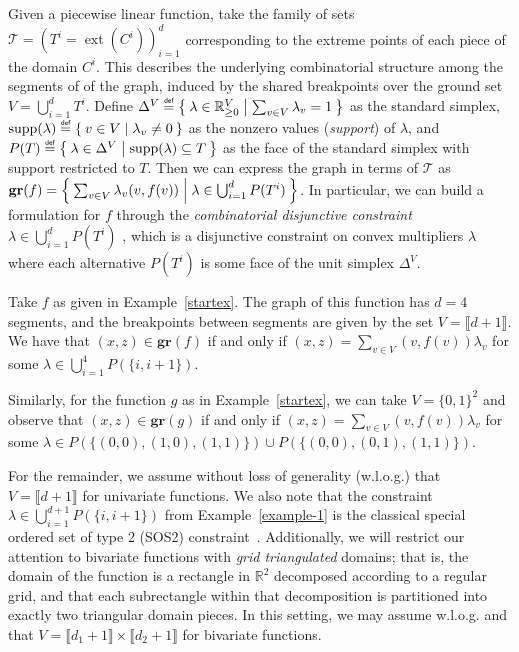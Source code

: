 \documentclass[opre,nonblindrev]{informs3} %
\newcommand{\blue}[1]{{#1}}
\newcommand{\bbR}{\mathbb{R}}
\newcommand{\calT}{\mathcal{T}}
\newcommand{\gr}{\textbf{gr}}
\newcommand{\ext}{\operatorname{ext}}
\newcommand{\supp}{\operatorname{supp}}
\newcommand\defeq{\mathrel{\overset{\makebox[0pt]{\mbox{\normalfont\tiny\sffamily def}}}{=}}}
\begin{document}
Given a piecewise linear function, take the family of sets $\calT = (T^i = \ext(C^i))_{i=1}^d$ corresponding to the extreme points of each piece of the domain $C^i$. This describes the underlying combinatorial structure among the segments of of the graph, induced by the shared breakpoints over the ground set $V = \bigcup_{i=1}^d T^i$. Define $\Delta^V \defeq \Set{\lambda \in \bbR^V_{\geq 0} | \sum_{v \in V} \lambda_v = 1 }$ as the standard simplex, $\supp(\lambda) \defeq \Set{v \in V | \lambda_v \neq 0 }$ as the nonzero values (\emph{support}) of $\lambda$, and $P(T) \defeq \Set{\lambda \in \Delta^V | \supp(\lambda) \subseteq T }$ as the face of the standard simplex with support restricted to $T$. Then we can express the graph in terms of $\calT$ as $\gr(f) = \Set{\sum_{v \in V} \lambda_v (v,f(v)) | \lambda \in \bigcup_{i=1}^d P(T^i) }$. In particular, we can build a formulation for $f$ through the \emph{combinatorial disjunctive constraint} $\lambda \in \bigcup_{i=1}^d P(T^i)$ \citep{Huchette:2016a}, which is a disjunctive constraint on convex multipliers $\lambda$ where each alternative $P(T^i)$ is some face of the unit simplex $\Delta^V$. 

\begin{example} \label{example-1}
	Take $f$ as given in Example~\ref{startex}. The graph of this function has $d=4$ segments, and the breakpoints between segments are given by the set $V=\llbracket d+1 \rrbracket$. We have that $(x,z) \in \gr(f)$ if and only if $(x,z) = \sum_{v \in V} (v,f(v))\lambda_v$ for some $\lambda\in \bigcup_{i=1}^4 P(\{i,i+1\})$.

	Similarly, for the function $g$ as in Example~\ref{startex}, we can take $V = \{0,1\}^2$ and observe that $(x,z) \in \gr(g)$ if and only if $(x,z) = \sum_{v \in V} (v,f(v)) \lambda_v$ for some $\lambda \in P(\{(0,0),(1,0),(1,1)\}) \cup P(\{(0,0),(0,1),(1,1)\})$.
\end{example}


For the remainder, we assume without loss of generality (w.l.o.g.) that $V=\llbracket d+1\rrbracket$ for univariate functions. We also note that the constraint $\lambda\in \bigcup_{i=1}^{d+1} P(\{i,i+1\})$ from Example~\ref{example-1} is the classical special ordered set of type 2 (SOS2) constraint~\citep{Beale:1970}. \blue{Additionally, we will restrict our attention to bivariate functions with \emph{grid triangulated} domains; that is, the domain of the function is a rectangle in $\bbR^2$ decomposed according to a regular grid, and that each subrectangle within that decomposition is partitioned into exactly two triangular domain pieces. In this setting, we may assume w.l.o.g. and that $V=\llbracket d_1+1 \rrbracket \times \llbracket d_2+1 \rrbracket$ for bivariate functions. 
}
\end{document}
